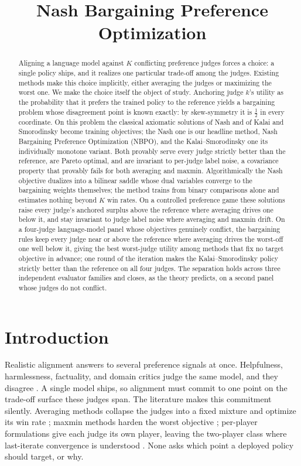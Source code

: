 \documentclass[letterpaper]{article} %
\title{Nash Bargaining Preference Optimization}
\begin{document}
\maketitle

\begin{abstract}
Aligning a language model against $K$ conflicting preference judges forces a choice: a single policy ships, and it realizes one particular trade-off among the judges. Existing methods make this choice implicitly, either averaging the judges or maximizing the worst one. We make the choice itself the object of study. Anchoring judge $k$'s utility as the probability that it prefers the trained policy to the reference yields a bargaining problem whose disagreement point is known exactly: by skew-symmetry it is $\tfrac12$ in every coordinate. On this problem the classical axiomatic solutions of Nash and of Kalai and Smorodinsky become training objectives; the Nash one is our headline method, Nash Bargaining Preference Optimization (NBPO), and the Kalai--Smorodinsky one its individually monotone variant. Both provably serve every judge strictly better than the reference, are Pareto optimal, and are invariant to per-judge label noise, a covariance property that provably fails for both averaging and maxmin. Algorithmically the Nash objective dualizes into a bilinear saddle whose dual variables converge to the bargaining weights themselves; the method trains from binary comparisons alone and estimates nothing beyond $K$ win rates. On a controlled preference game these solutions raise every judge's anchored surplus above the reference where averaging drives one below it, and stay invariant to judge label noise where averaging and maxmin drift. On a four-judge language-model panel whose objectives genuinely conflict, the bargaining rules keep every judge near or above the reference where averaging drives the worst-off one well below it, giving the best worst-judge utility among methods that fix no target objective in advance; one round of the iteration makes the Kalai--Smorodinsky policy strictly better than the reference on all four judges. The separation holds across three independent evaluator families and closes, as the theory predicts, on a second panel whose judges do not conflict.
\end{abstract}

\section{Introduction}
Realistic alignment answers to several preference signals at once. Helpfulness, harmlessness, factuality, and domain critics judge the same model, and they disagree \citep{bai2022training,dai2024safe}. A single model ships, so alignment must commit to one point on the trade-off surface these judges span. The literature makes this commitment silently. Averaging methods collapse the judges into a fixed mixture and optimize its win rate \citep{wu2025sppo,zhang2025iterative}; maxmin methods harden the worst objective \citep{chakraborty2024maxmin,son2026rmod}; per-player formulations give each judge its own player, leaving the two-player class where last-iterate convergence is understood \citep{wu2026mnpo}. None asks which point a deployed policy should target, or why.
\end{document}

